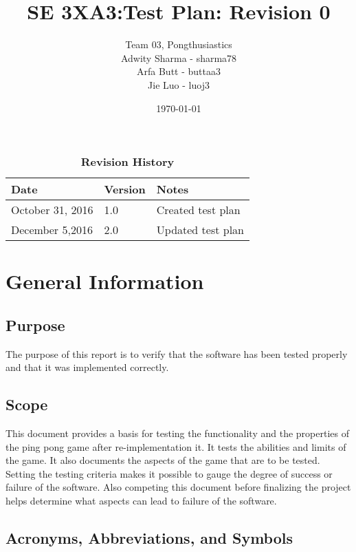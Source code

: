 \documentclass[12pt,letterpaper]{article}
\title{SE 3XA3:Test Plan: Revision 0}
\author{Team 03, Pongthusiastics 		
\\ Adwity Sharma - sharma78 		
\\ Arfa Butt - buttaa3 	
	\\ Jie Luo - luoj3 }
\date{\today}
\begin{document}
\maketitle
\newpage
\tableofcontents

\listoftables
\listoffigures
\begin{table}[h]
\caption{\bf Revision History}
\begin{tabularx}{\textwidth}{p{3.5cm}p{2cm}X}
\toprule {\bf Date} & {\bf Version} & {\bf Notes}\\
\midrule
October 31, 2016 & 1.0 & Created test plan \\
December 5,2016 & 2.0 & Updated test plan \\
\bottomrule
\end{tabularx}
\end{table}

\newpage
	
	\section{General Information}
	\subsection{Purpose}
	The purpose of this report is to verify that the software has been tested properly and that it was implemented correctly.
	
	\subsection{Scope}
	This document provides a basis for testing the functionality and the properties of the ping pong game after re-implementation it. It tests the abilities and limits of the game. It also documents the aspects of the game that are to be tested. Setting the testing criteria makes it possible to gauge the degree of success or failure of the software. Also competing this document before finalizing the project helps determine what aspects can lead to failure of the software.
	
	\subsection{Acronyms, Abbreviations, and Symbols}
\end{document}
